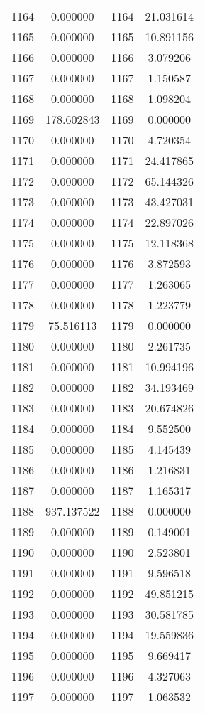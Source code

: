 \documentclass[12pt]{article}
\begin{document}
\begin{longtable}{@{}cccc@{}}
1164 & 0.000000 & 1164 & 21.031614 \\
1165 & 0.000000 & 1165 & 10.891156 \\
1166 & 0.000000 & 1166 & 3.079206 \\
1167 & 0.000000 & 1167 & 1.150587 \\
1168 & 0.000000 & 1168 & 1.098204 \\
1169 & 178.602843 & 1169 & 0.000000 \\
1170 & 0.000000 & 1170 & 4.720354 \\
1171 & 0.000000 & 1171 & 24.417865 \\
1172 & 0.000000 & 1172 & 65.144326 \\
1173 & 0.000000 & 1173 & 43.427031 \\
1174 & 0.000000 & 1174 & 22.897026 \\
1175 & 0.000000 & 1175 & 12.118368 \\
1176 & 0.000000 & 1176 & 3.872593 \\
1177 & 0.000000 & 1177 & 1.263065 \\
1178 & 0.000000 & 1178 & 1.223779 \\
1179 & 75.516113 & 1179 & 0.000000 \\
1180 & 0.000000 & 1180 & 2.261735 \\
1181 & 0.000000 & 1181 & 10.994196 \\
1182 & 0.000000 & 1182 & 34.193469 \\
1183 & 0.000000 & 1183 & 20.674826 \\
1184 & 0.000000 & 1184 & 9.552500 \\
1185 & 0.000000 & 1185 & 4.145439 \\
1186 & 0.000000 & 1186 & 1.216831 \\
1187 & 0.000000 & 1187 & 1.165317 \\
1188 & 937.137522 & 1188 & 0.000000 \\
1189 & 0.000000 & 1189 & 0.149001 \\
1190 & 0.000000 & 1190 & 2.523801 \\
1191 & 0.000000 & 1191 & 9.596518 \\
1192 & 0.000000 & 1192 & 49.851215 \\
1193 & 0.000000 & 1193 & 30.581785 \\
1194 & 0.000000 & 1194 & 19.559836 \\
1195 & 0.000000 & 1195 & 9.669417 \\
1196 & 0.000000 & 1196 & 4.327063 \\
1197 & 0.000000 & 1197 & 1.063532 \\

\end{longtable}
\end{document}
